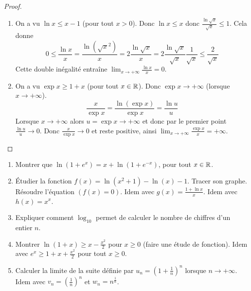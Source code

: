 \documentclass[class=report,crop=false]{standalone}
\begin{document}
\begin{proof}~
\begin{enumerate}
  \item On a vu $\ln x \le x-1$ (pour tout $x>0$).
  Donc $\ln x \le x$ donc $\frac{\ln \sqrt x}{\sqrt x} \le 1$. Cela donne
  $$0 \le \frac{\ln x}{x} = \frac{\ln \left(\sqrt{x}^2\right)}{x} = 2 \frac{\ln \sqrt x}{x}
  = 2 \frac{\ln \sqrt x}{\sqrt x} \frac{1}{\sqrt x} \le \frac{2}{\sqrt x}$$
  Cette double inégalité entraîne $\lim_{x\to +\infty} \frac{\ln x}{x} = 0$.

  \item On a vu $\exp x \ge 1+x$ (pour tout $x\in\mathbb{R}$).
  Donc $\exp x \to +\infty$ (lorsque $x\to+\infty$).
  $$\frac{x}{\exp x} = \frac{\ln(\exp x)}{\exp x} = \frac{\ln u}{u}$$
  Lorsque $x\to +\infty$ alors $u=\exp x \to +\infty$ et donc par le premier point
  $\frac{\ln u}{u} \to 0$. Donc $\frac{x}{\exp x} \to 0$ et reste positive, ainsi
  $\lim_{x\to +\infty} \frac{\exp x}{x} = +\infty$.
\end{enumerate}
\end{proof}




\begin{miniexercices}
\sauteligne
\begin{enumerate}
  \item Montrer que $\ln(1+e^x) = x + \ln(1+e^{-x})$, pour tout $x \in \mathbb{R}$.

  \item \'Etudier la fonction $f(x)=\ln(x^2+1)-\ln(x)-1$. Tracer son graphe. Résoudre l'équation
  $(f(x)=0)$. Idem avec $g(x)=\frac{1+\ln x}{x}$. Idem avec $h(x)=x^x$.

  \item Expliquer comment $\log_{10}$ permet de calculer le nombre de chiffres d'un entier $n$.

  \item Montrer $\ln(1+x) \ge x-\frac{x^2}{2}$ pour $x\ge0$ (faire une étude de fonction). Idem avec
  $e^x \ge 1+x+\frac{x^2}{2}$ pour tout $x \ge 0$.

  \item Calculer la limite de la suite définie par $u_n=\left(1+\frac1n\right)^n$ lorsque $n\to +\infty$.
  Idem avec $v_n=\left(\frac1n\right)^n$ et $w_n=n^{\frac1n}$.
\end{enumerate}
\end{miniexercices}
\end{document}
